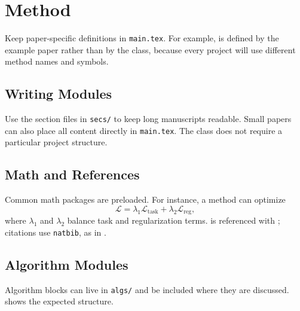\section{Method}

Keep paper-specific definitions in \texttt{main.tex}. For example,
\texttt{\string\method} is defined by the example paper rather than by the
class, because every project will use different method names and symbols.

\subsection{Writing Modules}

Use the section files in \texttt{secs/} to keep long manuscripts readable.
Small papers can also place all content directly in \texttt{main.tex}. The class
does not require a particular project structure.

\subsection{Math and References}

Common math packages are preloaded. For instance, a method can optimize
\begin{equation}
  \mathcal{L} = \lambda_1 \mathcal{L}_{\mathrm{task}}
    + \lambda_2 \mathcal{L}_{\mathrm{reg}},
  \label{eq:loss}
\end{equation}
where \(\lambda_1\) and \(\lambda_2\) balance task and regularization terms.
 is referenced with \texttt{\string\eqnref}; citations use
\texttt{natbib}, as in \cite{lamport1994latex,mittelbach2004latex}.

\subsection{Algorithm Modules}

Algorithm blocks can live in \texttt{algs/} and be included where they are
discussed.  shows the expected structure.



